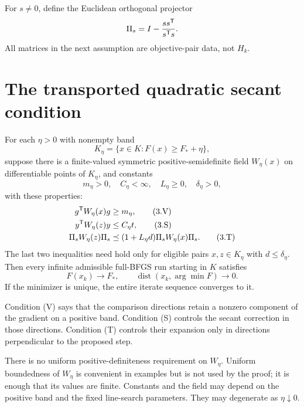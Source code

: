 For $s\ne0$, define the Euclidean orthogonal projector
\[
 \Pi_s=I-\frac{ss^{\mathsf T}}{s^{\mathsf T} s}.
\]
All matrices in the next assumption are objective-pair data, not $H_k$.


\setcounter{section}{2}
\setcounter{theorem}{0}
\setcounter{lemma}{0}
\setcounter{corollary}{0}
\setcounter{proposition}{0}
\setcounter{remark}{0}
\setcounter{equation}{3}


\section{The transported quadratic secant condition}

\begin{theorem}
For each $\eta>0$ with nonempty band
\[
 K_\eta=\{x\in K:F(x)\ge F_*+\eta\},
\]
suppose there is a finite-valued symmetric positive-semidefinite field $W_\eta(x)$ on differentiable points of $K_\eta$, and constants
\[
 m_\eta>0,\quad C_\eta<\infty,\quad L_\eta\ge0,\quad \delta_\eta>0,
\]
with these properties:
\begin{align}
 g^{\mathsf T} W_\eta(x)g&\ge m_\eta, \tag{3.V}\\
 y^{\mathsf T} W_\eta(z)y&\le C_\eta t, \tag{3.S}\\
 \Pi_s W_\eta(z)\Pi_s&\preceq
 (1+L_\eta d)\Pi_s W_\eta(x)\Pi_s. \tag{3.T}
\end{align}
The last two inequalities need hold only for eligible pairs $x,z\in K_\eta$ with $d\le\delta_\eta$. Then every infinite admissible full-BFGS run starting in $K$ satisfies
\[
 F(x_k)\to F_*,\qquad \operatorname{dist}(x_k,\arg\min F)\to0.
\]
If the minimizer is unique, the entire iterate sequence converges to it.
\end{theorem}
Condition (V) says that the comparison directions retain a nonzero component of the gradient on a positive band. Condition (S) controls the secant correction in those directions. Condition (T) controls their expansion only in directions perpendicular to the proposed step.

There is no uniform positive-definiteness requirement on $W_\eta$. Uniform boundedness of $W_\eta$ is convenient in examples but is not used by the proof; it is enough that its values are finite. Constants and the field may depend on the positive band and the fixed line-search parameters. They may degenerate as $\eta\downarrow0$.



